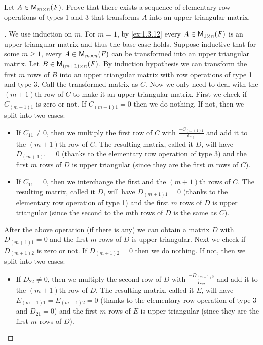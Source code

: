 \begin{ex}\label{ex:3.1.12}
	Let \(A \in \ms\).
	Prove that there exists a sequence of elementary row operations of types 1 and 3 that transforms \(A\) into an upper triangular matrix.
\end{ex}

\begin{proof}[]
	We use induction on \(m\).
	For \(m = 1\), by \cref{ex:1.3.12} every \(A \in \ms[1][n][\F]\) is an upper triangular matrix and thus the base case holds.
	Suppose inductive that for some \(m \geq 1\), every \(A \in \ms\) can be transformed into an upper triangular matrix.
	Let \(B \in \ms[(m + 1)][n][\F]\).
	By induction hypothesis we can transform the first \(m\) rows of \(B\) into an upper triangular matrix with row operations of type 1 and type 3.
	Call the transformed matrix as \(C\).
	Now we only need to deal with the \((m + 1)\)th row of \(C\) to make it an upper triangular matrix.
	First we check if \(C_{(m + 1) 1}\) is zero or not.
	If \(C_{(m + 1) 1} = 0\) then we do nothing.
	If not, then we split into two cases:
	\begin{itemize}
		\item If \(C_{1 1} \neq 0\), then we multiply the first row of \(C\) with \(\frac{-C_{(m + 1) 1}}{C_{1 1}}\) and add it to the \((m + 1)\)th row of \(C\).
		      The resulting matrix, called it \(D\), will have \(D_{(m + 1) 1} = 0\) (thanks to the elementary row operation of type 3) and the first \(m\) rows of \(D\) is upper triangular (since they are the first \(m\) rows of \(C\)).
		\item If \(C_{1 1} = 0\), then we interchange the first and the \((m + 1)\)th rows of \(C\).
		      The resulting matrix, called it \(D\), will have \(D_{(m + 1) 1} = 0\) (thanks to the elementary row operation of type 1) and the first \(m\) rows of \(D\) is upper triangular (since the second to the \(m\)th rows of \(D\) is the same as \(C\)).
	\end{itemize}
	After the above operation (if there is any) we can obtain a matrix \(D\) with \(D_{(m + 1) 1} = 0\) and the first \(m\) rows of \(D\) is upper triangular.
	Next we check if \(D_{(m + 1) 2}\) is zero or not.
	If \(D_{(m + 1) 2} = 0\) then we do nothing.
	If not, then we split into two cases:
	\begin{itemize}
		\item If \(D_{2 2} \neq 0\), then we multiply the second row of \(D\) with \(\frac{-D_{(m + 1) 2}}{D_{2 2}}\) and add it to the \((m + 1)\)th row of \(D\).
		      The resulting matrix, called it \(E\), will have \(E_{(m + 1) 1} = E_{(m + 1) 2} = 0\) (thanks to the elementary row operation of type 3 and \(D_{2 1} = 0\)) and the first \(m\) rows of \(E\) is upper triangular (since they are the first \(m\) rows of \(D\)).

\end{itemize}
\end{proof}
